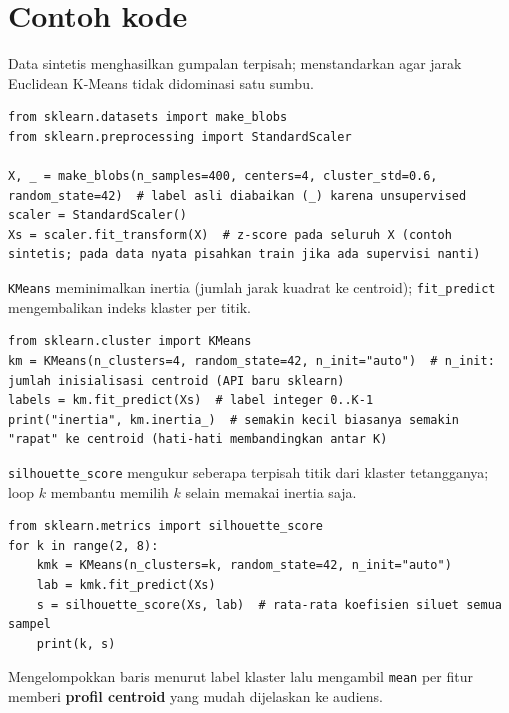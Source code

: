 \documentclass[../main.tex]{subfiles}
\begin{document}
\section{Contoh kode}

\MulaiPenjelasanKode Data sintetis  menghasilkan gumpalan terpisah;  menstandarkan agar jarak Euclidean K-Means tidak didominasi satu sumbu. \SelesaiPenjelasanKode

\begin{lstlisting}[caption=Data dan scaling]
from sklearn.datasets import make_blobs
from sklearn.preprocessing import StandardScaler

X, _ = make_blobs(n_samples=400, centers=4, cluster_std=0.6, random_state=42)  # label asli diabaikan (_) karena unsupervised
scaler = StandardScaler()
Xs = scaler.fit_transform(X)  # z-score pada seluruh X (contoh sintetis; pada data nyata pisahkan train jika ada supervisi nanti)
\end{lstlisting}

\MulaiPenjelasanKode \texttt{KMeans} meminimalkan inertia (jumlah jarak kuadrat ke centroid); \texttt{fit\_predict} mengembalikan indeks klaster per titik. \SelesaiPenjelasanKode

\begin{lstlisting}[caption=KMeans dan inertia]
from sklearn.cluster import KMeans
km = KMeans(n_clusters=4, random_state=42, n_init="auto")  # n_init: jumlah inisialisasi centroid (API baru sklearn)
labels = km.fit_predict(Xs)  # label integer 0..K-1
print("inertia", km.inertia_)  # semakin kecil biasanya semakin "rapat" ke centroid (hati-hati membandingkan antar K)
\end{lstlisting}

\MulaiPenjelasanKode \texttt{silhouette\_score} mengukur seberapa terpisah titik dari klaster tetangganya; loop $k$ membantu memilih $k$ selain memakai inertia saja. \SelesaiPenjelasanKode

\begin{lstlisting}[caption=Silhouette score untuk beberapa k]
from sklearn.metrics import silhouette_score
for k in range(2, 8):
    kmk = KMeans(n_clusters=k, random_state=42, n_init="auto")
    lab = kmk.fit_predict(Xs)
    s = silhouette_score(Xs, lab)  # rata-rata koefisien siluet semua sampel
    print(k, s)
\end{lstlisting}

\MulaiPenjelasanKode Mengelompokkan baris menurut label klaster lalu mengambil \texttt{mean} per fitur memberi \textbf{profil centroid} yang mudah dijelaskan ke audiens. \SelesaiPenjelasanKode
\end{document}
